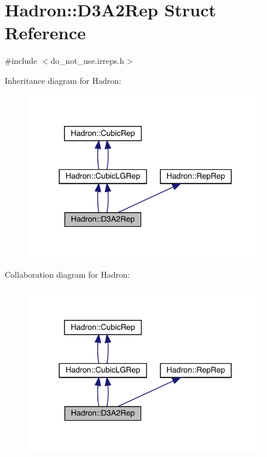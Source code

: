 \hypertarget{structHadron_1_1D3A2Rep}{}\section{Hadron\+:\+:D3\+A2\+Rep Struct Reference}
\label{structHadron_1_1D3A2Rep}


{\ttfamily \#include $<$do\+\_\+not\+\_\+use.\+irreps.\+h$>$}



Inheritance diagram for Hadron\+:\nopagebreak
\begin{figure}[H]
\begin{center}
\leavevmode
\includegraphics[width=300pt]{da/d7e/structHadron_1_1D3A2Rep__inherit__graph}
\end{center}
\end{figure}


Collaboration diagram for Hadron\+:\nopagebreak
\begin{figure}[H]
\begin{center}
\leavevmode
\includegraphics[width=300pt]{d3/d14/structHadron_1_1D3A2Rep__coll__graph}
\end{center}
\end{figure}
